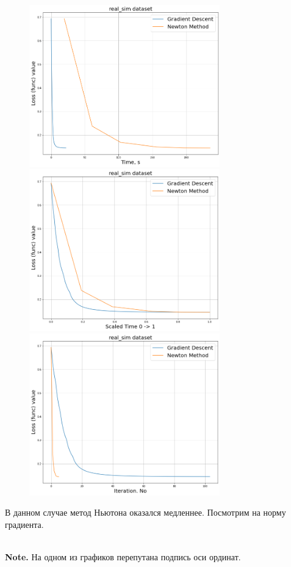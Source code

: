 \documentclass[14pt]{article}
\begin{document}
\begin{figure}[h]
	\centering
	\includegraphics[height=7cm]{real_time.png}
	\includegraphics[height=7cm]{real_scale_time.png}
	\includegraphics[height=7cm]{real_time_no.png}
\end{figure}

В данном случае метод Ньютона оказался медленнее. Посмотрим на норму градиента.
 
 \\ \textbf{Note.} На одном из графиков перепутана подпись оси ординат.
 
\end{document}
